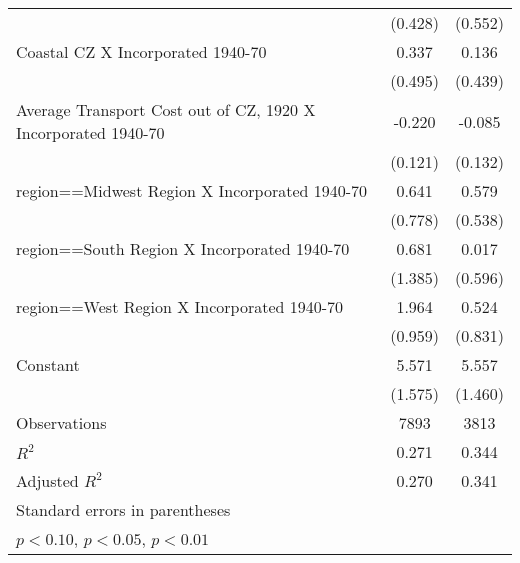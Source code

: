 \begin{table}[htbp]
\begin{tabular}{l*{2}{c}}
                    &     (0.428)         &     (0.552)         \\
[1em]
Coastal CZ X Incorporated 1940-70&       0.337         &       0.136         \\
                    &     (0.495)         &     (0.439)         \\
[1em]
Average Transport Cost out of CZ, 1920 X Incorporated 1940-70&      -0.220\sym{*}  &      -0.085         \\
                    &     (0.121)         &     (0.132)         \\
[1em]
region==Midwest Region X Incorporated 1940-70&       0.641         &       0.579         \\
                    &     (0.778)         &     (0.538)         \\
[1em]
region==South Region X Incorporated 1940-70&       0.681         &       0.017         \\
                    &     (1.385)         &     (0.596)         \\
[1em]
region==West Region X Incorporated 1940-70&       1.964\sym{**} &       0.524         \\
                    &     (0.959)         &     (0.831)         \\
[1em]
Constant            &       5.571\sym{***}&       5.557\sym{***}\\
                    &     (1.575)         &     (1.460)         \\
\hline
Observations        &        7893         &        3813         \\
\(R^{2}\)           &       0.271         &       0.344         \\
Adjusted \(R^{2}\)  &       0.270         &       0.341         \\
\hline\hline
\multicolumn{3}{l}{\footnotesize Standard errors in parentheses}\\
\multicolumn{3}{l}{\footnotesize \sym{*} \(p<0.10\), \sym{**} \(p<0.05\), \sym{***} \(p<0.01\)}\\
\end{tabular}
\end{table}
